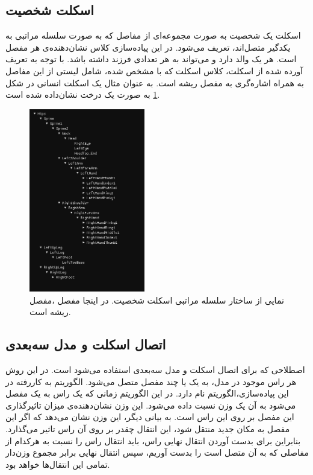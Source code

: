 \subsection{اسکلت شخصیت}

اسکلت یک شخصیت به صورت مجموعه‌ای از مفاصل که به صورت سلسله مراتبی به یکدگیر متصل‌اند، تعریف می‌شود.
در این پیاده‌سازی کلاس 
نشان‌دهنده‌ی هر مفصل است.
هر 
یک والد دارد و می‌تواند به هر تعدادی فرزند داشته باشد.
با توجه به تعریف آورده شده از اسکلت، کلاس اسکلت که با
مشخص شده، شامل لیستی از این مفاصل به همراه اشاره‌گری به مفصل ریشه است.
به عنوان مثال یک اسکلت انسانی در شکل 
\ref{fig:Skeleton}
به صورت یک درخت نشان‌داده شده است.

\begin{figure}[ht]
	\centerline{\includegraphics[width=\textwidth,height=8cm,keepaspectratio]{Figures/Ch5/Skeleton.png}}

	\caption{نمایی از ساختار سلسله مراتبی اسکلت شخصیت. در اینجا مفصل  ،مفصل ریشه است.}
	\label{fig:Skeleton}
\end{figure}



\subsection{اتصال اسکلت و مدل سه‌بعدی}
اصطلاحی که برای اتصال اسکلت و مدل سه‌بعدی استفاده می‌شود
است.
در این روش هر راس موجود در مدل، به یک یا چند مفصل متصل می‌شود.
الگوریتم به کار‌رفته در این پیاده‌سازی،الگوریتم
نام دارد. در این الگوریتم زمانی که یک راس به یک مفصل می‌شود به آن یک وزن نسبت داده می‌شود.
این وزن نشان‌دهنده‌ی میزان تاثیرگذاری این مفصل بر روی این راس است.
به بیانی دیگر، این وزن نشان می‌دهد که اگر این مفصل به مکان جدید منتقل شود، این انتقال چقدر بر روی آن راس تاثیر می‌گذارد.
بنابراین برای بدست آوردن انتقال نهایی راس، باید انتقال راس را نسبت به هرکدام از مفاصلی که به آن متصل است را بدست آوریم، سپس انتقال نهایی
برابر مجموع وزن‌دار تمامی این انتقال‌ها خواهد بود. 

